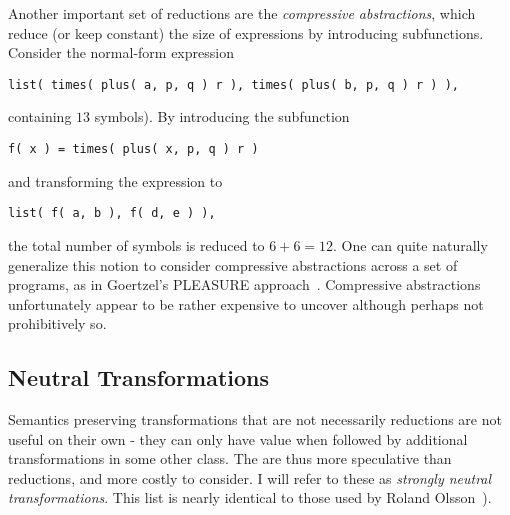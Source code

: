 \documentclass[letterpaper]{article}
\begin{document}
Another important set of reductions are the \emph{compressive abstractions},
which reduce (or keep constant) the size of expressions by introducing
subfunctions. Consider the normal-form expression
\begin{verbatim}
list( times( plus( a, p, q ) r ), times( plus( b, p, q ) r ) ),
\end{verbatim}
containing $13$ symbols). By introducing the subfunction 
\begin{verbatim}
f( x ) = times( plus( x, p, q ) r )
\end{verbatim} 
and transforming the expression to 
\begin{verbatim}
list( f( a, b ), f( d, e ) ),
\end{verbatim}
the total number of symbols is reduced to $6 + 6 = 12$. One can quite naturally
generalize this notion to consider compressive abstractions across a set of
programs, as in Goertzel's PLEASURE approach~\cite{PLEASURE}. Compressive
abstractions unfortunately appear to be rather expensive to uncover although
perhaps not prohibitively so.

\subsection{Neutral Transformations}

Semantics preserving transformations that are not necessarily reductions are
not useful on their own - they can only have value when followed by additional
transformations in some other class. The are thus more speculative than
reductions, and more costly to consider. I will refer to these as
\emph{strongly neutral transformations}. This list is nearly identical to those
used by Roland Olsson~\cite{ADATE}).
\end{document}
